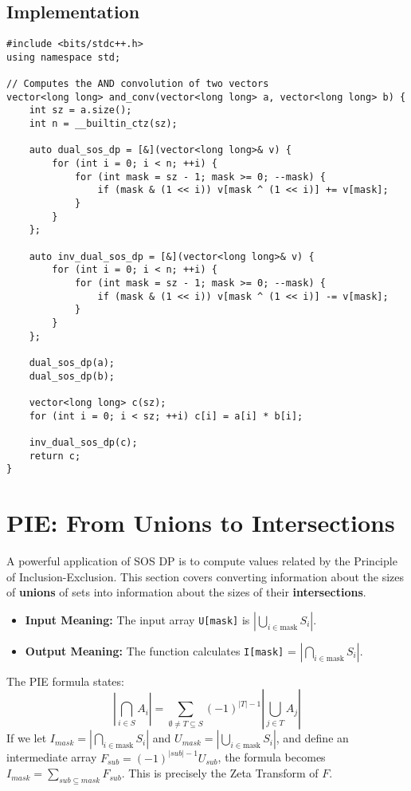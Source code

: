 \documentclass[10pt,a4paper]{article}
\begin{document}
\subsection{Implementation}
\begin{lstlisting}
#include <bits/stdc++.h>
using namespace std;

// Computes the AND convolution of two vectors
vector<long long> and_conv(vector<long long> a, vector<long long> b) {
    int sz = a.size();
    int n = __builtin_ctz(sz);

    auto dual_sos_dp = [&](vector<long long>& v) {
        for (int i = 0; i < n; ++i) {
            for (int mask = sz - 1; mask >= 0; --mask) {
                if (mask & (1 << i)) v[mask ^ (1 << i)] += v[mask];
            }
        }
    };

    auto inv_dual_sos_dp = [&](vector<long long>& v) {
        for (int i = 0; i < n; ++i) {
            for (int mask = sz - 1; mask >= 0; --mask) {
                if (mask & (1 << i)) v[mask ^ (1 << i)] -= v[mask];
            }
        }
    };

    dual_sos_dp(a);
    dual_sos_dp(b);

    vector<long long> c(sz);
    for (int i = 0; i < sz; ++i) c[i] = a[i] * b[i];

    inv_dual_sos_dp(c);
    return c;
}
\end{lstlisting}

\section{PIE: From Unions to Intersections}
A powerful application of SOS DP is to compute values related by the Principle of Inclusion-Exclusion. This section covers converting information about the sizes of \textbf{unions} of sets into information about the sizes of their \textbf{intersections}. 
\begin{itemize}
    \item \textbf{Input Meaning:} The input array \texttt{U[mask]} is $|\bigcup_{i \in \text{mask}} S_i|$.
    \item \textbf{Output Meaning:} The function calculates \texttt{I[mask]} = $|\bigcap_{i \in \text{mask}} S_i|$.
\end{itemize}
The PIE formula states:
$$ |\bigcap_{i \in S} A_i| = \sum_{\emptyset \neq T \subseteq S} (-1)^{|T|-1} |\bigcup_{j \in T} A_j| $$
If we let $I_{mask} = |\bigcap_{i \in \text{mask}} S_i|$ and $U_{mask} = |\bigcup_{i \in \text{mask}} S_i|$, and define an intermediate array $F_{sub} = (-1)^{|sub|-1} U_{sub}$, the formula becomes $I_{mask} = \sum_{sub \subseteq mask} F_{sub}$. This is precisely the Zeta Transform of $F$.
\end{document}
